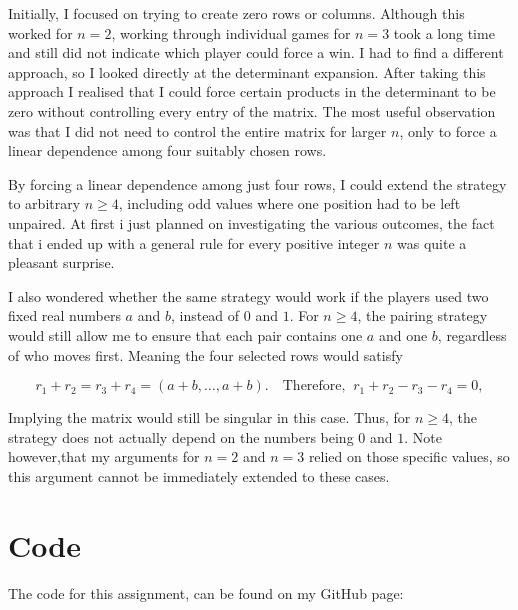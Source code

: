 \documentclass[11pt]{article}
\newcommand{\keywordfont}{\textsc}
\newcommand{\keyword}[1]{%
  \marginpar{\raggedright\small\keywordfont{#1}}}
\begin{document}
\medskip
\keyword{REFLECT}
Initially, I focused on trying to
create zero rows or columns. Although
this worked for $n=2$, working through
individual games for $n=3$ took a long
time and still did not indicate which
player could force a win.
I had to find a different approach, so I looked directly at the determinant expansion. After taking this approach I realised that I could force certain products in the determinant to be zero without controlling every entry of the matrix.
The most useful observation was that
I did not need to control the entire
matrix for larger $n$, only to force
a linear dependence among four
suitably chosen rows.

\keyword{GENERAL}
By forcing a linear dependence
among just four rows, I could
extend the strategy to arbitrary
$n\geq4$, including odd values
where one position had to be
left unpaired.
At first i just planned on investigating the various outcomes, the fact that i ended up with a general rule for every positive integer $n$ was quite a pleasant surprise.

\medskip
\keyword{EXTENSION}
I also wondered whether the same strategy would work if the players used two fixed real numbers $a$ and $b$, instead of $0$ and $1$. For $n\geq4$, the pairing strategy
would still allow me to ensure that each pair contains one $a$ and one $b$, regardless of who moves first. Meaning the four selected rows would satisfy

$$ r_1+r_2=r_3+r_4 =(a+b,\ldots,a+b). 
\quad
\text{Therefore,}\;\; r_1+r_2-r_3-r_4=0,$$

Implying the matrix would still be singular in this case.
Thus, for $n\geq4$, the strategy
does not actually depend on the
numbers being $0$ and $1$.
Note however,that my arguments for $n=2$
and $n=3$ relied on those specific
values, so this argument cannot be immediately extended to these cases.


\section*{Code}
The code for this assignment, can be found on my GitHub page:\\  
\url{}
\end{document}
